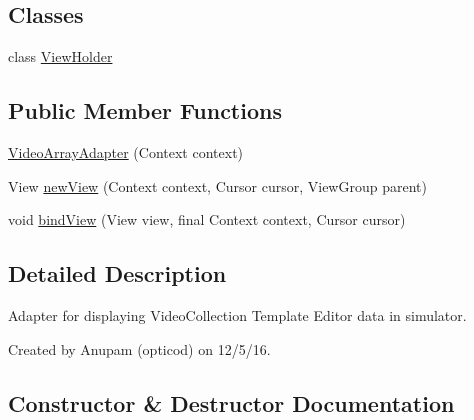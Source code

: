 \subsection*{Classes}
\begin{DoxyCompactItemize}
\item 
class \hyperlink{classorg_1_1buildmlearn_1_1toolkit_1_1videocollectiontemplate_1_1adapter_1_1VideoArrayAdapter_1_1ViewHolder}{View\+Holder}
\end{DoxyCompactItemize}
\subsection*{Public Member Functions}
\begin{DoxyCompactItemize}
\item 
\hyperlink{classorg_1_1buildmlearn_1_1toolkit_1_1videocollectiontemplate_1_1adapter_1_1VideoArrayAdapter_ad6f370a86eac06d1977646460e0010d9}{Video\+Array\+Adapter} (Context context)
\item 
View \hyperlink{classorg_1_1buildmlearn_1_1toolkit_1_1videocollectiontemplate_1_1adapter_1_1VideoArrayAdapter_a4c9cf5a88035bb2fcdf117d92360ae9f}{new\+View} (Context context, Cursor cursor, View\+Group parent)
\item 
void \hyperlink{classorg_1_1buildmlearn_1_1toolkit_1_1videocollectiontemplate_1_1adapter_1_1VideoArrayAdapter_a59425346233ea2e7ee6768f302d0ac33}{bind\+View} (View view, final Context context, Cursor cursor)
\end{DoxyCompactItemize}


\subsection{Detailed Description}
Adapter for displaying Video\+Collection Template Editor data in simulator. 

Created by Anupam (opticod) on 12/5/16. 

\subsection{Constructor \& Destructor Documentation}
